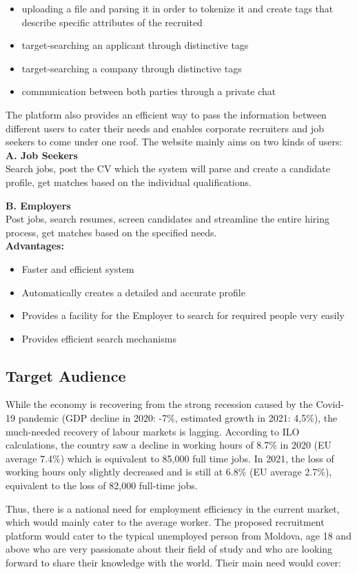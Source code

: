 \begin{itemize}
    \item uploading a file and parsing it in order to tokenize it and create tags that describe specific attributes of the recruited
    \item target-searching an applicant through distinctive tags
    \item target-searching a company through distinctive tags
    \item communication between both parties through a private chat
\end{itemize}

The platform also provides an efficient way to pass the information between different users to cater their needs and enables corporate recruiters and job seekers to come under one roof. The website mainly aims on two kinds of users: \\

\textbf{A. Job Seekers} \\
Search jobs, post the CV which the system will parse and create a candidate profile, get matches based on the individual qualifications.

\textbf{B. Employers} \\
Post jobs, search resumes, screen candidates and streamline the entire hiring process, get matches based on the specified needs. \\

\textbf{Advantages:}

\begin{itemize}
    \item Faster and efficient system 
    \item Automatically creates a detailed and accurate profile
    \item Provides a facility for the Employer to search for required people very easily 
    \item Provides efficient search mechanisms
\end{itemize}

\subsection{Target Audience}

\par While the economy is recovering from the strong recession caused by the Covid-19 pandemic (GDP decline in 2020: -7\%, estimated growth in 2021: 4,5\%), the much-needed recovery of labour markets is lagging. According to ILO calculations, the country saw a decline in working hours of 8.7\% in 2020 (EU average 7.4\%) which is equivalent to 85,000 full time jobs. In 2021, the loss of working hours only slightly decreased and is still at 6.8\% (EU average 2.7\%), equivalent to the loss of 82,000 full-time jobs. 
\\
\par Thus, there is a national need for employment efficiency in the current market, which would mainly cater to the average worker. The proposed recruitment platform would cater to the typical unemployed person from Moldova, age 18 and above who are very passionate about their field of study and who are looking forward to share their knowledge with the world. Their main need would cover:

